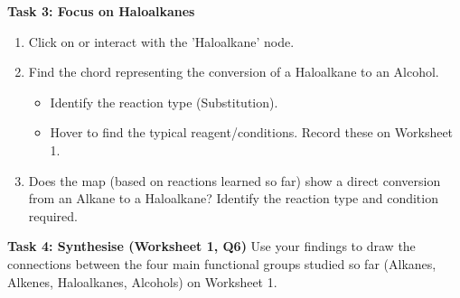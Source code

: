 \documentclass[11pt, a4paper]{article} %
\begin{document}
\textbf{Task 3: Focus on Haloalkanes}
\begin{enumerate}
    \item Click on or interact with the 'Haloalkane' node.
    \item Find the chord representing the conversion of a Haloalkane to an Alcohol.
        \begin{itemize}
            \item Identify the reaction type (Substitution).
            \item Hover to find the typical reagent/conditions. Record these on Worksheet 1.
        \end{itemize}
    \item Does the map (based on reactions learned so far) show a direct conversion from an Alkane to a Haloalkane? Identify the reaction type and condition required.
\end{enumerate}

\textbf{Task 4: Synthesise (Worksheet 1, Q6)}
Use your findings to draw the connections between the four main functional groups studied so far (Alkanes, Alkenes, Haloalkanes, Alcohols) on Worksheet 1.
\end{document}
